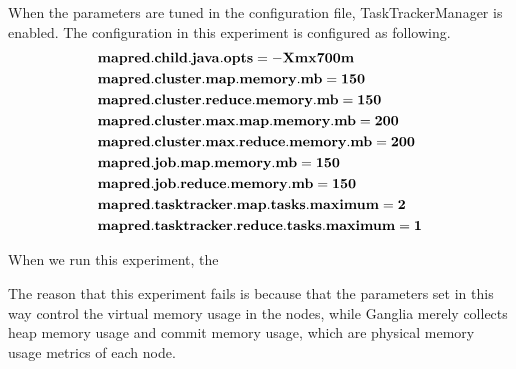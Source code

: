 When the parameters are tuned in the configuration file, TaskTrackerManager is enabled. The configuration in this experiment is configured as following.
\begin{align*}
&{\bf mapred.child.java.opts = -Xmx700m}\\
&{\bf mapred.cluster.map.memory.mb = 150}\\
&{\bf mapred.cluster.reduce.memory.mb = 150}\\
&{\bf mapred.cluster.max.map.memory.mb = 200}\\
&{\bf mapred.cluster.max.reduce.memory.mb = 200}\\
&{\bf mapred.job.map.memory.mb = 150}\\
&{\bf mapred.job.reduce.memory.mb = 150}\\
&{\bf mapred.tasktracker.map.tasks.maximum = 2}\\
&{\bf mapred.tasktracker.reduce.tasks.maximum = 1}\\
\end{align*}

When we run this experiment, the 
\par
The reason that this experiment fails is because that the parameters set in this way control the virtual memory usage in the nodes, while Ganglia merely collects heap memory usage and commit memory usage, which are physical memory usage metrics of each node. 